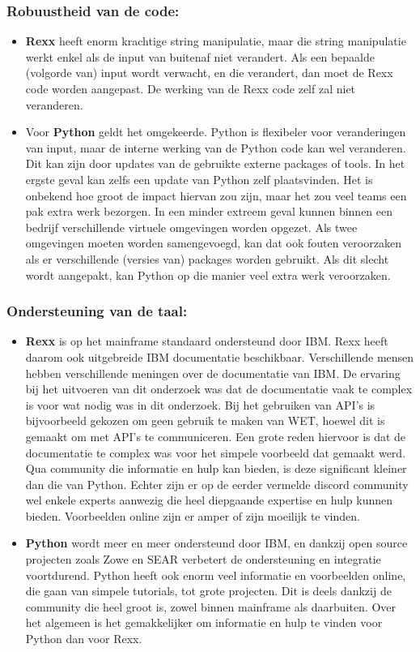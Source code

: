 \subsubsection{Robuustheid van de code:}
    \begin{itemize}
        \item \textbf{Rexx} heeft enorm krachtige string manipulatie, maar die string manipulatie werkt enkel als de input van buitenaf niet verandert. Als een bepaalde (volgorde van) input wordt verwacht, en die verandert, dan moet de Rexx code worden aangepast. De werking van de Rexx code zelf zal niet veranderen.
        \item Voor \textbf{Python} geldt het omgekeerde. Python is flexibeler voor veranderingen van input, maar de interne werking van de Python code kan wel veranderen. Dit kan zijn door updates van de gebruikte externe packages of tools. In het ergste geval kan zelfs een update van Python zelf plaatsvinden. Het is onbekend hoe groot de impact hiervan zou zijn, maar het zou veel teams een pak extra werk bezorgen. In een minder extreem geval kunnen binnen een bedrijf verschillende virtuele omgevingen worden opgezet. Als twee omgevingen moeten worden samengevoegd, kan dat ook fouten veroorzaken als er verschillende (versies van) packages worden gebruikt. Als dit slecht wordt aangepakt, kan Python op die manier veel extra werk veroorzaken.
    \end{itemize}
    
\subsubsection{Ondersteuning van de taal:}
    \begin{itemize}
        \item \textbf{Rexx} is op het mainframe standaard ondersteund door IBM. Rexx heeft daarom ook uitgebreide IBM documentatie beschikbaar. Verschillende mensen hebben verschillende meningen over de documentatie van IBM. De ervaring bij het uitvoeren van dit onderzoek was dat de documentatie vaak te complex is voor wat nodig was in dit onderzoek. Bij het gebruiken van API's is bijvoorbeeld gekozen om geen gebruik te maken van WET, hoewel dit is gemaakt om met API's te communiceren. Een grote reden hiervoor is dat de documentatie te complex was voor het simpele voorbeeld dat gemaakt werd. Qua community die informatie en hulp kan bieden, is deze significant kleiner dan die van Python. Echter zijn er op de eerder vermelde discord community wel enkele experts aanwezig die heel diepgaande expertise en hulp kunnen bieden. Voorbeelden online zijn er amper of zijn moeilijk te vinden.
        \item \textbf{Python} wordt meer en meer ondersteund door IBM, en dankzij open source projecten zoals Zowe en SEAR verbetert de ondersteuning en integratie voortdurend. Python heeft ook enorm veel informatie en voorbeelden online, die gaan van simpele tutorials, tot grote projecten. Dit is deels dankzij de community die heel groot is, zowel binnen mainframe als daarbuiten. Over het algemeen is het gemakkelijker om informatie en hulp te vinden voor Python dan voor Rexx.
    \end{itemize}
